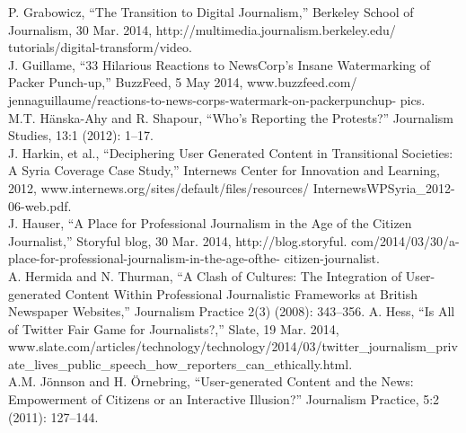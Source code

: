 \begin{enumerate}
P. Grabowicz, ``The Transition to Digital Journalism,'' Berkeley School of
Journalism, 30 Mar. 2014, http://multimedia.journalism.berkeley.edu/
tutorials/digital-transform/video.\\
J. Guillame, ``33 Hilarious Reactions to NewsCorp's Insane Watermarking
of Packer Punch-up,'' BuzzFeed, 5 May 2014, www.buzzfeed.com/
jennaguillaume/reactions-to-news-corps-watermark-on-packerpunchup-
pics.\\
M.T. Hänska-Ahy and R. Shapour, ``Who's Reporting the Protests?''
Journalism Studies, 13:1 (2012): 1–17.\\
J. Harkin, et al., ``Deciphering User Generated Content in Transitional
Societies: A Syria Coverage Case Study,'' Internews Center for Innovation
and Learning, 2012, www.internews.org/sites/default/files/resources/
InternewsWPSyria_2012-06-web.pdf.\\
J. Hauser, ``A Place for Professional Journalism in the Age of the
Citizen Journalist,'' Storyful blog, 30 Mar. 2014, http://blog.storyful.
com/2014/03/30/a-place-for-professional-journalism-in-the-age-ofthe-
citizen-journalist.\\
A. Hermida and N. Thurman, ``A Clash of Cultures: The Integration of
User-generated Content Within Professional Journalistic Frameworks at
British Newspaper Websites,'' Journalism Practice 2(3) (2008): 343–356.
A. Hess, ``Is All of Twitter Fair Game for Journalists?,'' Slate, 19 Mar. 2014,
www.slate.com/articles/technology/technology/2014/03/twitter_journalism_private_lives_public_speech_how_reporters_can_ethically.html.\\
A.M. Jönnson and H. Örnebring, ``User-generated Content and the News:
Empowerment of Citizens or an Interactive Illusion?'' Journalism Practice,
5:2 (2011): 127–144.\\


\end{enumerate}
